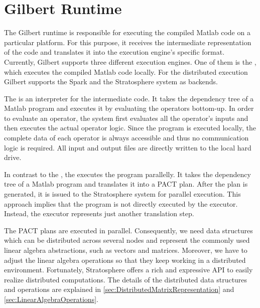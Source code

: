 \chapter{Gilbert Runtime}
\label{cha:gilbertruntime}


The Gilbert runtime is responsible for executing the compiled Matlab code on a particular platform.
For this purpose, it receives the intermediate representation of the code and translates it into the execution engine's specific format.
Currently, Gilbert supports three different execution engines.
One of them is the , which executes the compiled Matlab code locally.
For the distributed execution Gilbert supports the Spark and the Stratosphere system as backends.

The  is an interpreter for the intermediate code.
It takes the dependency tree of a Matlab program and executes it by evaluating the operators bottom-up.
In order to evaluate an operator, the system first evaluates all the operator's inputs and then executes the actual operator logic.
Since the program is executed locally, the complete data of each operator is always accessible and thus no communication logic is required.
All input and output files are directly written to the local hard drive.

In contrast to the , the  executes the program parallelly.
It takes the dependency tree of a Matlab program and translates it into a PACT plan.
After the plan is generated, it is issued to the Stratosphere system for parallel execution.
This approach implies that the program is not directly executed by the executor.
Instead, the executor represents just another translation step.

The PACT plans are executed in parallel.
Consequently, we need data structures which can be distributed across several nodes and represent the commonly used linear algebra abstractions, such as vectors and matrices.
Moreover, we have to adjust the linear algebra operations so that they keep working in a distributed environment.
Fortunately, Stratosphere offers a rich and expressive API to easily realize distributed computations.
The details of the distributed data structures and operations are explained in \cref{sec:DistributedMatrixRepresentation} and \cref{sec:LinearAlgebraOperations}.

